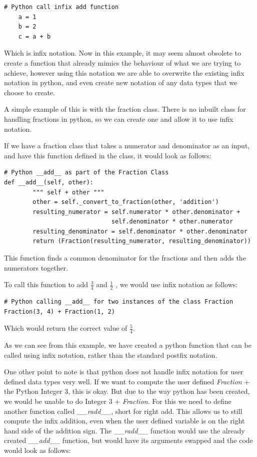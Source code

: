\documentclass[12pt]{article}
\begin{document}
\begin{lstlisting}
# Python call infix add function
    a = 1
    b = 2
    c = a + b
\end{lstlisting}

Which is infix notation. Now in this example, it may seem almost obsolete to create a function that already mimics the behaviour of what we are trying to achieve, however using this notation we are able to overwrite the existing infix notation in python, and even create new notation of any data types that we choose to create.

A simple example of this is with the fraction class. There is no inbuilt class for handling fractions in python, so we can create one and allow it to use infix notation.

If we have a fraction class that takes a numerator and denominator as an input, and have this function defined in the class, it would look as follows:


\begin{lstlisting}
# Python __add__ as part of the Fraction Class
def __add__(self, other):
        """ self + other """
        other = self._convert_to_fraction(other, 'addition')
        resulting_numerator = self.numerator * other.denominator +
                              self.denominator * other.numerator
        resulting_denominator = self.denominator * other.denominator
        return (Fraction(resulting_numerator, resulting_denominator))
\end{lstlisting}

This function finds a common denominator for the fractions and then adds the numerators together.

To call this function to add $\frac{3}{4}$ and $\frac{1}{2}$ , we would use infix notation as follows:


\begin{lstlisting}
# Python calling __add__ for two instances of the class Fraction
Fraction(3, 4) + Fraction(1, 2)
\end{lstlisting}

Which would return the correct value of $\frac{5}{4}$.

As we can see from this example, we have created a python function that can be called using infix notation, rather than the standard postfix notation.

One other point to note is that python does not handle infix notation for user defined data types very well. If we want to compute the user defined \textit{Fraction} + the Python Integer $3$, this is okay. But due to the way python has been created, we would be unable to do Integer $3$ + \textit{Fraction}. For this we need to define another function called \textit{\_\_radd\_\_}, short for right add. This allows us to still compute the infix addition, even when the user defined variable is on the right hand side of the addition sign. The \textit{\_\_radd\_\_} function would use the already created \textit{\_\_add\_\_} function, but would have its arguments swapped and the code would look as follows:
\end{document}
